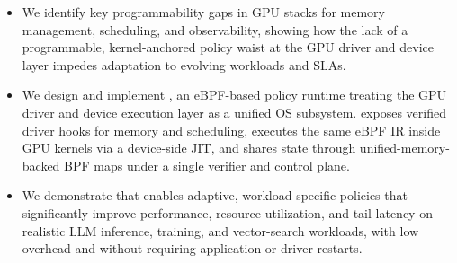\begin{itemize}[leftmargin=*,itemsep=0pt]
  \item We identify key programmability gaps in GPU stacks for memory management, scheduling, and observability, showing how the lack of a programmable, kernel-anchored policy waist at the GPU driver and device layer impedes adaptation to evolving workloads and SLAs.
  \item We design and implement \sys, an eBPF-based policy runtime treating the GPU driver and device execution layer as a unified OS subsystem. \sys exposes verified driver hooks for memory and scheduling, executes the same eBPF IR inside GPU kernels via a device-side JIT, and shares state through unified-memory-backed BPF maps under a single verifier and control plane.
  \item We demonstrate that \sys enables adaptive, workload-specific policies that significantly improve performance, resource utilization, and tail latency on realistic LLM inference, training, and vector-search workloads, with low overhead and without requiring application or driver restarts.
\end{itemize}